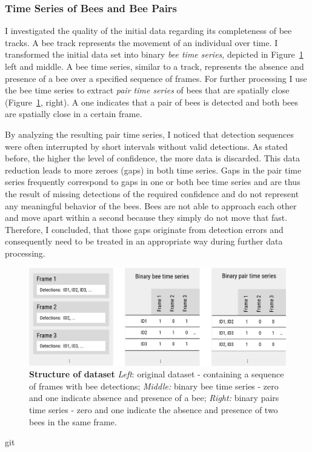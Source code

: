 \subsubsection{Time Series of Bees and Bee Pairs}
\label{subsec:tracking}
I investigated the quality of the initial data regarding its completeness of bee tracks.
A bee track represents the movement of an individual over time.
I transformed the initial data set into binary \emph{bee time series}, depicted in Figure~\ref{fig:structure} left and middle.
A bee time series, similar to a track, represents the absence and presence of a bee over a specified sequence of frames.
For further processing I use the bee time series to extract \emph{pair time series} of bees that are spatially close (Figure~\ref{fig:structure}, right).
A one indicates that a pair of bees is detected and both bees are spatially close in a certain frame.

By analyzing the resulting pair time series, I noticed that detection sequences were often interrupted by short intervals without valid detections.
As stated before, the higher the level of confidence, the more data is discarded.
This data reduction leads to more zeroes (gaps) in both time series.
Gaps in the pair time series frequently correspond to gaps in one or both bee time series and are thus the result of missing detections of the required confidence and do not represent any meaningful behavior of the bees.
Bees are not able to approach each other and move apart within a second because they simply do not move that fast.
Therefore, I concluded, that those gaps originate from detection errors and consequently need to be treated in an appropriate way during further data processing.

\begin{figure}[htb]
	\centering
	\includegraphics[width=1.0\textwidth]{Figures/structure}
	\caption[Structure of dataset]{\textbf{Structure of dataset} \emph{Left}: original dataset - containing a sequence of frames with bee detections; \emph{Middle:} binary bee time series - zero and one indicate absence and presence of a bee; \emph{Right:} binary pairs time series - zero and one indicate the absence and presence of two bees in the same frame.}
	\label{fig:structure}
\end{figure}git